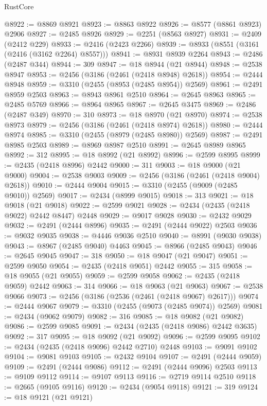 \begin{lexlean}{RustCore}
\begin{coremodule}
@8922 := @8869 @8921
@8923 := @8863 @8922
@8926 := @8577 (@8861 @8923) @2906
@8927 := @2485 @8926
@8929 := @2251 (@8563 @8927)
@8931 := @2409 (@2412 @229)
@8933 := @2416 (@2423 @2266)
@8939 := @8933 (@8551 (@3161 (@2416 (@3162 @2264) @8557)))
@8941 := @8931 @8939 @2264
@8943 := @2486 (@2487 @344)
@8944 := 309
@8947 := @18 @8944 (@21 @8944)
@8948 := @2538 @8947
@8953 := @2456 (@3186 (@2461 (@2418 @8948) @2618))
@8954 := @2444 @8948
@8959 := @3310 (@2455 (@8953 (@2485 @8954)) @2569)
@8961 := @2491 @8959 @2503
@8963 := @8943 @8961 @2510
@8964 := @2645 @8963
@8965 := @2485 @5769
@8966 := @8964 @8965
@8967 := @2645 @3475
@8969 := @2486 (@2487 @349)
@8970 := 310
@8973 := @18 @8970 (@21 @8970)
@8974 := @2538 @8973
@8979 := @2456 (@3186 (@2461 (@2418 @8974) @2618))
@8980 := @2444 @8974
@8985 := @3310 (@2455 (@8979 (@2485 @8980)) @2569)
@8987 := @2491 @8985 @2503
@8989 := @8969 @8987 @2510
@8991 := @2645 @8989 @8965
@8992 := 312
@8995 := @18 @8992 (@21 @8992)
@8996 := @2599 @8995
@8999 := @2435 (@2418 @8996) @2442
@9000 := 311
@9003 := @18 @9000 (@21 @9000)
@9004 := @2538 @9003
@9009 := @2456 (@3186 (@2461 (@2418 @9004) @2618))
@9010 := @2444 @9004
@9015 := @3310 (@2455 (@9009 (@2485 @9010)) @2569)
@9017 := @2434 (@8999 @9015)
@9018 := 313
@9021 := @18 @9018 (@21 @9018)
@9022 := @2599 @9021
@9028 := @2434 (@2435 (@2418 @9022) @2442 @8447) @2448
@9029 := @9017 @9028
@9030 := @2432 @9029
@9032 := @2491 (@2444 @8996)
@9035 := @2491 (@2444 @9022) @2503
@9036 := @9032 @9035
@9038 := @4446 @9036 @2510
@9040 := @8991 (@9030 @9038)
@9043 := @8967 (@2485 @9040) @4463
@9045 := @8966 (@2485 @9043)
@9046 := @2645 @9045
@9047 := 318
@9050 := @18 @9047 (@21 @9047)
@9051 := @2599 @9050
@9054 := @2435 (@2418 @9051) @2442
@9055 := 315
@9058 := @18 @9055 (@21 @9055)
@9059 := @2599 @9058
@9062 := @2435 (@2418 @9059) @2442
@9063 := 314
@9066 := @18 @9063 (@21 @9063)
@9067 := @2538 @9066
@9073 := @2456 (@3186 (@2536 (@2461 (@2418 @9067) @2617)))
@9074 := @2444 @9067
@9079 := @3310 (@2455 (@9073 (@2485 @9074)) @2569)
@9081 := @2434 (@9062 @9079)
@9082 := 316
@9085 := @18 @9082 (@21 @9082)
@9086 := @2599 @9085
@9091 := @2434 (@2435 (@2418 @9086) @2442 @3635)
@9092 := 317
@9095 := @18 @9092 (@21 @9092)
@9096 := @2599 @9095
@9102 := @2434 (@2435 (@2418 @9096) @2442 @2710) @2448
@9103 := @9091 @9102
@9104 := @9081 @9103
@9105 := @2432 @9104
@9107 := @2491 (@2444 @9059)
@9109 := @2491 (@2444 @9086)
@9112 := @2491 (@2444 @9096) @2503
@9113 := @9109 @9112
@9114 := @9107 @9113
@9116 := @2719 @9114 @2510
@9118 := @2665 (@9105 @9116)
@9120 := @2434 (@9054 @9118)
@9121 := 319
@9124 := @18 @9121 (@21 @9121)

\end{coremodule}
\end{lexlean}
